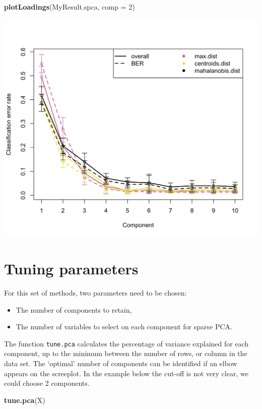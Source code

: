 \documentclass[]{book}
\newenvironment{Shaded}{\begin{snugshade}}{\end{snugshade}}
\newcommand{\KeywordTok}[1]{\textcolor[rgb]{0.13,0.29,0.53}{\textbf{#1}}}
\newcommand{\DataTypeTok}[1]{\textcolor[rgb]{0.13,0.29,0.53}{#1}}
\newcommand{\DecValTok}[1]{\textcolor[rgb]{0.00,0.00,0.81}{#1}}
\newcommand{\NormalTok}[1]{#1}
\providecommand{\tightlist}{%
  \setlength{\itemsep}{0pt}\setlength{\parskip}{0pt}}
\theoremstyle{definition}
\theoremstyle{definition}
\theoremstyle{definition}
\theoremstyle{remark}
\begin{document}
\begin{Shaded}
\begin{Highlighting}[]
\KeywordTok{plotLoadings}\NormalTok{(MyResult.spca, }\DataTypeTok{comp =} \DecValTok{2}\NormalTok{)}
\end{Highlighting}
\end{Shaded}

\begin{center}\includegraphics[width=0.5\linewidth]{Figures/unnamed-chunk-13-1} \end{center}

\section{Tuning parameters}\label{tuning-parameters}

For this set of methods, two parameters need to be chosen:

\begin{itemize}
\tightlist
\item
  The number of components to retain,
\item
  The number of variables to select on each component for sparse PCA.
\end{itemize}

The function \texttt{tune.pca} calculates the percentage of variance
explained for each component, up to the minimum between the number of
rows, or column in the data set. The `optimal' number of components can
be identified if an elbow appears on the screeplot. In the example below
the cut-off is not very clear, we could choose 2 components.

\begin{Shaded}
\begin{Highlighting}[]
\KeywordTok{tune.pca}\NormalTok{(X)}
\end{Highlighting}
\end{Shaded}
\end{document}
